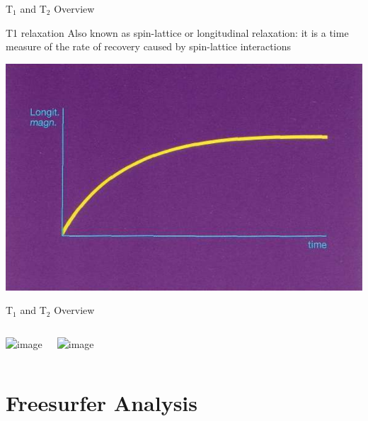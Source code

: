\documentclass[aspectratio=169,xcolor=dvipsnames]{beamer}
\begin{document}
\begin{frame}{T$_{1}$ and T$_{2}$ Overview}
    \begin{block}{T1 relaxation}
        Also known as spin-lattice or longitudinal relaxation: it is a time measure of the rate of recovery caused by spin-lattice interactions
    \end{block}
\begin{center}
\includegraphics[width=.75\textwidth]{imgs/T1recoverycurve}

\end{center}
\end{frame}


\begin{frame}{T$_{1}$ and T$_{2}$ Overview}
\begin{columns}[c]
\begin{center}
\includegraphics<1->[width=1\textwidth]{imgs/t1t2}
\end{center}

\begin{center}
\includegraphics<2->[width=.8\textwidth]{imgs/t1brain}
\end{center}
\end{columns}

\end{frame}


\section{Freesurfer Analysis}
\end{document}
